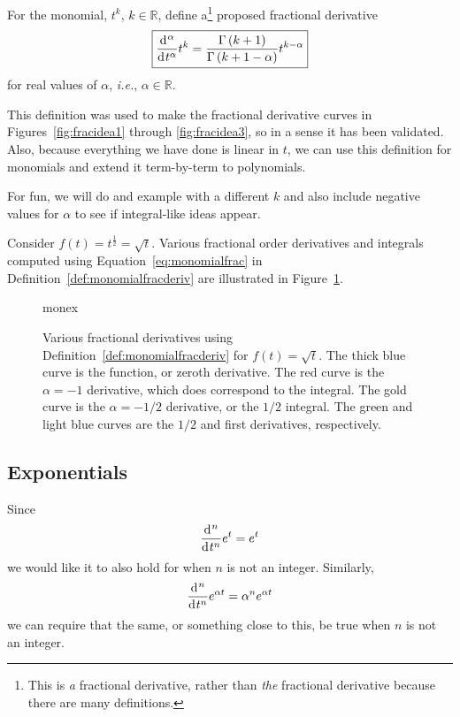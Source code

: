 \begin{definition}
  For the monomial, $t^k$, $k \in \mathbb R$, define a\footnote{This is \emph{a} fractional derivative, rather than \emph{the} fractional derivative because there are many definitions. } proposed fractional derivative 
  \begin{equation}
    \boxed{
    \frac{\operatorname{d}\hspace*{-1pt}^\alpha}{\operatorname{d}\hspace*{-1pt} t^\alpha} t^k = \frac{\Gamma\left( k + 1 \right)}{\Gamma \left( k + 1 - \alpha \right)} t^{k - \alpha} }
    \label{eq:monomialfrac}
  \end{equation}
  for real values of $\alpha$, \textit{i.e.}, $\alpha \in \mathbb R$.
  \label{def:monomialfracderiv}
\end{definition}

This definition was used to make the fractional derivative curves in Figures~\ref{fig:fracidea1} through
\ref{fig:fracidea3}, so in a sense it has been validated. Also, because everything we have done is linear in $t$, we can
use this definition for monomials and extend it term-by-term to polynomials. 

For fun, we will do and example with a different $k$ and also include negative values for $\alpha$ to see if integral-like ideas appear.

\begin{example}
  Consider $f(t) = t^\frac{1}{2} = \sqrt{t}$. Various fractional order derivatives and integrals computed using Equation~\ref{eq:monomialfrac} in Definition~\ref{def:monomialfracderiv} are illustrated in Figure~\ref{fig:monex}.

  \begin{figure}
    \centering
    {monex}
    \caption{Various fractional derivatives using Definition~\ref{def:monomialfracderiv} for $f(t) = \sqrt{t}$. The thick blue curve is the function, or zeroth derivative. The red curve is the $\alpha = -1$ derivative, which does correspond to the integral. The gold curve is the $\alpha = -1/2$ derivative, or the $1/2$ integral. The green and light blue curves are the $1/2$ and first derivatives, respectively.}
    \label{fig:monex}
  \end{figure}
\end{example}


\subsection{Exponentials}
Since
\begin{equation*}
  \frac{\operatorname{d}\hspace*{-1pt}^n}{\operatorname{d}\hspace*{-1pt} t^n}e^t = e^t
\end{equation*}
we would like it to also hold for when $n$ is not an integer.  Similarly, 
\begin{equation*}
  \frac{\operatorname{d}\hspace*{-1pt}^n}{\operatorname{d}\hspace*{-1pt} t^n} e^{\alpha t} = \alpha^n e^{\alpha t}
\end{equation*}
we can require that the same, or something close to this, be true when $n$ is not an integer.


